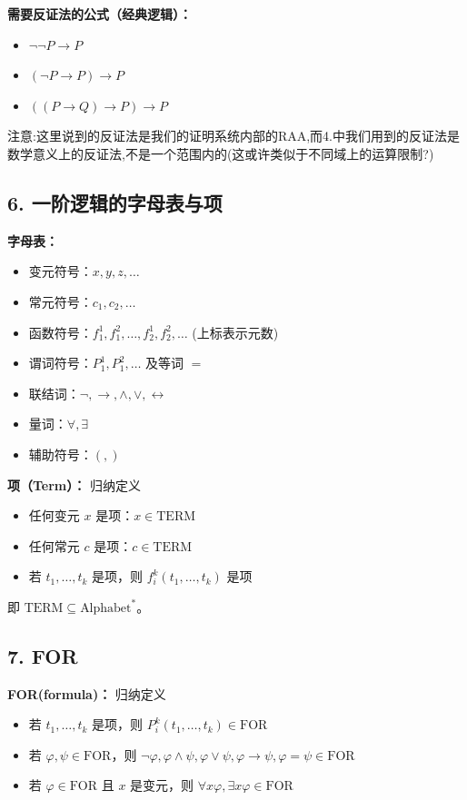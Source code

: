 \documentclass[12pt, a4paper]{article}
\begin{document}
\textbf{需要反证法的公式（经典逻辑）：}
\begin{itemize}
    \item $\neg\neg P \to P$
    \item $(\neg P \to P) \to P$
    \item $((P \to Q) \to P) \to P$ \quad 
\end{itemize}

注意:这里说到的反证法是我们的证明系统内部的RAA,而4.中我们用到的反证法是数学意义上的反证法,不是一个范围内的(这或许类似于不同域上的运算限制?)

\subsection*{6. 一阶逻辑的字母表与项}
\textbf{字母表：}
\begin{itemize}
    \item 变元符号：\(x, y, z, \dots\)
    \item 常元符号：\(c_1, c_2, \dots\)
    \item 函数符号：\(f_1^1, f_1^2, \dots, f_2^1, f_2^2, \dots\) (上标表示元数)
    \item 谓词符号：\(P_1^1, P_1^2, \dots\) 及等词 \(=\)
    \item 联结词：\(\neg, \to, \wedge, \vee, \leftrightarrow\)
    \item 量词：\(\forall, \exists\)
    \item 辅助符号：\((, )\)
\end{itemize}

\textbf{项（Term）：} 归纳定义
\begin{itemize}
    \item 任何变元 \(x\) 是项：\(x \in \text{TERM}\)
    \item 任何常元 \(c\) 是项：\(c \in \text{TERM}\)
    \item 若 \(t_1, \dots, t_k\) 是项，则 \(f_i^k(t_1, \dots, t_k)\) 是项
\end{itemize}
即 \(\text{TERM} \subseteq \text{Alphabet}^*\)。

\subsection*{7. FOR}
\textbf{FOR(formula)：} 归纳定义
\begin{itemize}
    \item 若 \(t_1, \dots, t_k\) 是项，则 \(P_i^k(t_1, \dots, t_k) \in \text{FOR}\)
    \item 若 \(\varphi, \psi \in \text{FOR}\)，则 \(\neg\varphi, \varphi \wedge \psi, \varphi \vee \psi, \varphi \to \psi,\varphi = \psi \in \text{FOR}\)
    \item 若 \(\varphi \in \text{FOR}\) 且 \(x\) 是变元，则 \(\forall x \varphi, \exists x \varphi \in \text{FOR}\)
\end{itemize}
\end{document}
